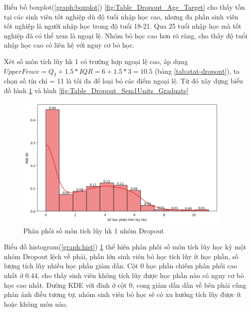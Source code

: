     Biểu bồ boxplot(\ref{graph:boxplot}) \ref{fig:Table_Dropout_Age_Target} cho thấy tồn tại các sinh viên tốt nghiệp dù độ tuổi nhập học cao, nhưng đa phần sinh viên tốt nghiệp là người nhập học trong độ tuổi 18-21. Qua 25 tuổi nhập học mà tốt nghiệp đã có thể xem là ngoại lệ. Nhóm bỏ học cao hơn rõ ràng, cho thấy độ tuổi nhập học cao có liên hệ với nguy cơ bỏ học.

    Xét số môn tích lũy hk 1 có trường hợp ngoại lệ cao, áp dụng $UpperFence = Q_3 + 1.5 *IQR = 6 + 1.5*3 = 10.5$ (bảng \ref{tab:stat-dropout}), ta chọn số tín chỉ = 11 là tối đa để loại bỏ các điểm ngoại lệ. Từ đó xây dựng biểu đồ hình \ref{fig:Table_Dropout_Sem1Units_Dropout} và hình \ref{fig:Table_Dropout_Sem1Units_Graduate}
        
    \begin{figure}[htp]
        \centering
        \includegraphics[width=0.95\textwidth]{images/Table_Dropout_Sem1Units_Dropout.png}
        \caption{Phân phối số môn tích lũy hk 1 nhóm Dropout}
        \label{fig:Table_Dropout_Sem1Units_Dropout}
    \end{figure}

    \FloatBarrier
    
    Biểu đồ histogram(\ref{graph:hist}) \ref{fig:Table_Dropout_Sem1Units_Dropout} thể hiện phân phối số môn tích lũy học kỳ một nhóm Dropout lệch về phải, phần lớn sinh viên bỏ học tích lũy ít học phần, số lượng tích lũy nhiều học phần giảm dần. Cột 0 học phần chiếm phân phối cao nhất ở 0.44, cho thấy sinh viên không tích lũy được học phần nào có nguy cơ bỏ học cao nhất. Đường KDE với đỉnh ở cột 0, cong giảm dần dần về bên phải cũng phản ánh điều tương tự, nhóm sinh viên bỏ học sẽ có xu hướng tích lũy được ít hoặc không môn nào.

